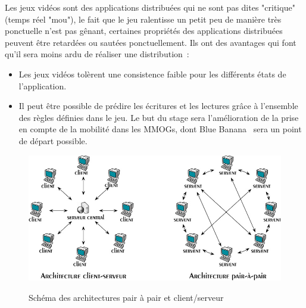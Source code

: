 	\par Les jeux vidéos sont des applications distribuées qui ne sont pas dites "critique" (temps réel "mou"), le fait que le jeu ralentisse un petit peu de manière très ponctuelle n'est pas gênant, certaines propriétés des applications distribuées peuvent être retardées ou sautées ponctuellement. Ils ont des avantages qui font qu'il sera moins ardu de réaliser une distribution~\cite{1267692}:
	\begin{itemize}
		\renewcommand{\labelitemi}{$\bullet$}
		\item Les jeux vidéos tolèrent une consistence faible pour les différents états de l'application.
		\item Il peut être possible de prédire les écritures et les lectures grâce à l'ensemble des règles définies dans le jeu. Le but du stage sera l'amélioration de la prise en compte de la mobilité dans les MMOGs, dont Blue Banana~\cite{191} sera un point de départ possible.
	\end{itemize}
	\vspace{1cm}
	\begin{figure}[!h]
	\centering
	\includegraphics[scale=0.5]{../Images/p2p-85145.png}\\
	\caption{Schéma des architectures pair à pair et client/serveur}
	\label{P2P/ClServ}
	\end{figure} 
\newpage
